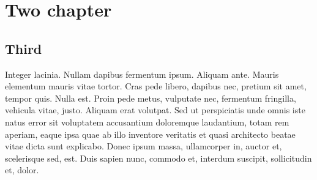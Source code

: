 \documentclass[
  color, %
  table, %
  lof,   %
  lot,   %
]{fithesis3}
\begin{document}
\chapter{Two chapter}
\section{Third}
Integer lacinia. Nullam dapibus fermentum ipsum. Aliquam ante. Mauris elementum mauris vitae tortor. Cras pede libero, dapibus nec, pretium sit amet, tempor quis. Nulla est. Proin pede metus, vulputate nec, fermentum fringilla, vehicula vitae, justo. Aliquam erat volutpat. Sed ut perspiciatis unde omnis iste natus error sit voluptatem accusantium doloremque laudantium, totam rem aperiam, eaque ipsa quae ab illo inventore veritatis et quasi architecto beatae vitae dicta sunt explicabo. Donec ipsum massa, ullamcorper in, auctor et, scelerisque sed, est. Duis sapien nunc, commodo et, interdum suscipit, sollicitudin et, dolor.
\end{document}

